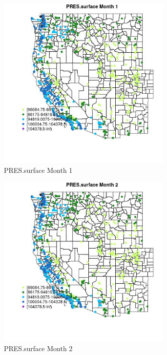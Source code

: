 \begin{figure} 
\centering  
\includegraphics[width=0.77\textwidth]{Code_Outputs/Report_ML_input_PM25_Step4_part_e_de_duplicated_aves_compiled_2019-05-21wNAs_MapObsMo1PRESsurface.jpg} 
\caption{\label{fig:Report_ML_input_PM25_Step4_part_e_de_duplicated_aves_compiled_2019-05-21wNAsMapObsMo1PRESsurface}PRES.surface Month 1} 
\end{figure} 
 

\clearpage 

\begin{figure} 
\centering  
\includegraphics[width=0.77\textwidth]{Code_Outputs/Report_ML_input_PM25_Step4_part_e_de_duplicated_aves_compiled_2019-05-21wNAs_MapObsMo2PRESsurface.jpg} 
\caption{\label{fig:Report_ML_input_PM25_Step4_part_e_de_duplicated_aves_compiled_2019-05-21wNAsMapObsMo2PRESsurface}PRES.surface Month 2} 
\end{figure} 
 

